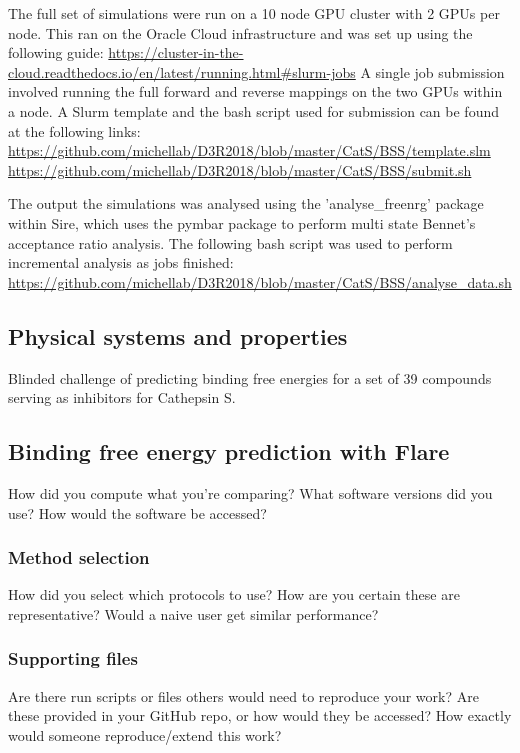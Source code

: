 \documentclass[9pt,comparison]{livecoms}
\begin{document}
The full set of simulations were run on a 10 node GPU cluster with 2
GPUs per node. This ran on the Oracle Cloud infrastructure and was set up
using the following guide:
\url{https://cluster-in-the-cloud.readthedocs.io/en/latest/running.html#slurm-jobs}
A single job submission involved running the full forward
and reverse mappings on the two GPUs within a node. A Slurm template and
the bash script used for submission can be found at the following links:
\url{https://github.com/michellab/D3R2018/blob/master/CatS/BSS/template.slm}
\url{https://github.com/michellab/D3R2018/blob/master/CatS/BSS/submit.sh}

The output the simulations was analysed using the 'analyse\_freenrg'
package within Sire, which uses the pymbar package to perform multi
state Bennet's acceptance ratio analysis. The following bash script
was used to perform incremental analysis as jobs finished:
\url{https://github.com/michellab/D3R2018/blob/master/CatS/BSS/analyse_data.sh}

\subsection{Physical systems and properties}

Blinded challenge of predicting binding free energies for a set of 39 compounds serving as inhibitors for Cathepsin S. 

\subsection{Binding free energy prediction with Flare}
How did you compute what you're comparing? 
What software versions did you use?
How would the software be accessed?


\subsubsection{Method selection}
How did you select which protocols to use? How are you certain these are representative? Would a naive user get similar performance? 

\subsubsection{Supporting files}
Are there run scripts or files others would need to reproduce your work? Are these provided in your GitHub repo, or how would they be accessed? 
How exactly would someone reproduce/extend this work?
\end{document}
